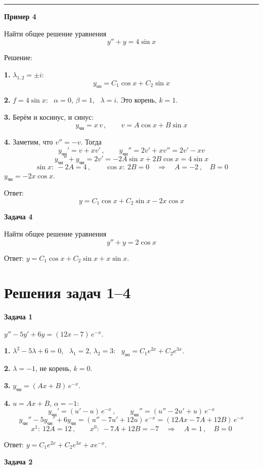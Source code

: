 \documentclass[11pt,a4paper]{article}
\newcommand{\example}[1]{\par\medskip\noindent\textbf{#1}\par\nopagebreak\smallskip}
\newcommand{\yoo}{y_{\text{оо}}}
\newcommand{\ych}{y_{\text{чн}}}
\begin{document}
\medskip\hrule\medskip

\example{Пример 4}

Найти общее решение уравнения
\[
  y'' + y = 4\sin x
\]

Решение:

\textbf{1.} $\lambda_{1,2} = \pm i$:
\[
  \yoo = C_1\cos x + C_2\sin x
\]

\textbf{2.} $f = 4\sin x$: \ $\alpha = 0$, $\beta = 1$, \ $\lambda = i$. Это корень, $k = 1$.

\textbf{3.} Берём и косинус, и синус:
\[
  \ych = x\, v\,, \qquad v = A\cos x + B\sin x
\]

\textbf{4.} Заметим, что $v'' = -v$. Тогда
\[
  \ych' = v + x v'\,, \qquad \ych'' = 2v' + x v'' = 2v' - x v
\]
\[
  \ych'' + \ych = 2v' = -2A\sin x + 2B\cos x = 4\sin x
\]
\[
  \sin x:\ -2A = 4\,, \qquad \cos x:\ 2B = 0
  \quad\Rightarrow\quad
  A = -2\,, \quad B = 0
\]
$\ych = -2x\cos x$.

Ответ:
\[
  y = C_1\cos x + C_2\sin x - 2x\cos x
\]

\example{Задача 4}

Найти общее решение уравнения
\[
  y'' + y = 2\cos x
\]

Ответ: $y = C_1\cos x + C_2\sin x + x\sin x$.


\newpage

\section*{Решения задач 1--4}

\example{Задача 1}

$y'' - 5y' + 6y = (12x - 7)\, e^{-x}$.

\textbf{1.} $\lambda^2 - 5\lambda + 6 = 0$, \ $\lambda_1 = 2$, $\lambda_2 = 3$: \ $\yoo = C_1 e^{2x} + C_2 e^{3x}$.

\textbf{2.} $\lambda = -1$, не корень, $k = 0$.

\textbf{3.} $\ych = (Ax + B)\, e^{-x}$.

\textbf{4.} $u = Ax + B$, $\alpha = -1$:
\[
  \ych' = (u' - u)\, e^{-x}\,, \qquad \ych'' = (u'' - 2u' + u)\, e^{-x}
\]
\[
  \ych'' - 5\ych' + 6\ych = (u'' - 7u' + 12u)\, e^{-x} = (12Ax - 7A + 12B)\, e^{-x}
\]
\[
  x^1:\ 12A = 12\,, \qquad x^0:\ -7A + 12B = -7
  \quad\Rightarrow\quad
  A = 1\,, \quad B = 0
\]

Ответ: $y = C_1 e^{2x} + C_2 e^{3x} + x e^{-x}$.

\example{Задача 2}
\end{document}

